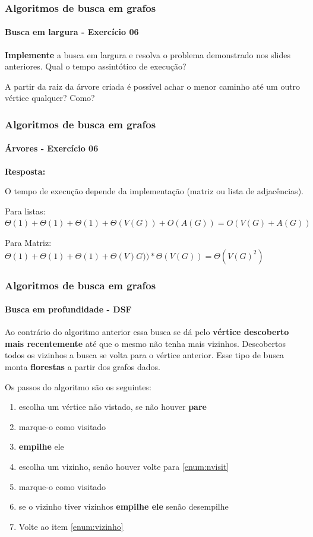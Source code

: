 \begin{frame}
	\frametitle{Algoritmos de busca em grafos}
	\framesubtitle{Busca em largura - Exercício 06}
	\par \textbf{Implemente} a busca em largura e resolva o problema demonstrado nos slides anteriores. Qual o tempo assintótico de execução?
	\par A partir da raiz da árvore criada é possível achar o menor caminho até um outro vértice qualquer? Como?
\end{frame}

\begin{frame}[allowframebreaks]
	\frametitle{Algoritmos de busca em grafos}
	\framesubtitle{Árvores - Exercício 06}
	\par \textbf{Resposta:}
	\par O tempo de execução depende da implementação (matriz ou lista de adjacências).
	\par Para listas: $\Theta(1) + \Theta(1) + \Theta(1) + \Theta(V(G)) + O(A(G)) =O(V(G)+A(G)) $
	\par Para Matriz: $\Theta(1) + \Theta(1) + \Theta(1) + \Theta(V)G))*\Theta(V(G)) = \Theta(V(G)^2)$
	
\end{frame}

\begin{frame}
	\frametitle{Algoritmos de busca em grafos}
	\framesubtitle{Busca em profundidade - DSF}
	\par Ao contrário do algoritmo anterior essa busca se dá pelo \textbf{vértice descoberto mais recentemente} até que o mesmo não tenha mais vizinhos. Descobertos todos os vizinhos a busca se volta para o vértice anterior. Esse tipo de busca monta \textbf{florestas} a partir dos grafos dados.
	
	\par Os passos do algoritmo são os seguintes:
	\begin{enumerate}
		\item escolha um vértice não vistado, se não houver \textbf{pare} \label{enum:nvisit}
		\item marque-o como visitado
		\item \textbf{empilhe} ele
		\item escolha um vizinho, senão houver volte para \ref{enum:nvisit} \label{enum:vizinho}
		\item marque-o como visitado
		\item se o vizinho tiver vizinhos \textbf{empilhe ele} senão desempilhe
		\item Volte ao item \ref{enum:vizinho}
	\end{enumerate}
\end{frame}

